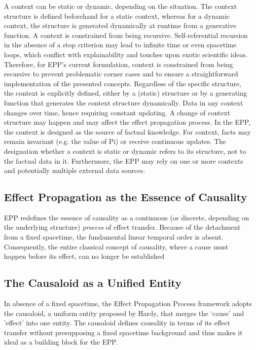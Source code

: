 A context can be static or dynamic, depending on the situation. The context structure is defined beforehand for a static context, whereas for a dynamic context, the structure is generated dynamically at runtime from a generative function. A context is constrained from being recursive. Self-referential recursion in the absence of a stop criterion may lead to infinite time or even spacetime loops, which conflict with explainability and touches upon exotic scientific ideas. Therefore, for EPP's current formulation, context is constrained from being recursive to prevent problematic corner cases and to ensure a straightforward implementation of the presented concepts. Regardless of the specific structure, the context is explicitly defined, either by a (static) structure or by a generating function that generates the context structure dynamically.
Data in any context changes over time, hence requiring constant updating. A change of context structure may happen and may affect the effect propagation process. 
In the EPP, the context is designed as the source of factual knowledge. For context, facts may remain invariant (e.g. the value of Pi) or receive continuous updates. The designation whether a context is static or dynamic refers to its structure, not to the factual data in it. Furthermore, the EPP may rely on one or more contexts and potentially multiple external data sources.
    
\subsection{Effect Propagation as the Essence of Causality}
\label{ssec:recap_effect_propagation}

EPP redefines the essence of causality  as a continuous (or discrete, depending on the underlying structure) \textit{process} of effect transfer. Because of the detachment from a fixed spacetime, the fundamental linear temporal order is absent. Consequently, the entire classical concept of causality, where a cause must happen before its effect, can no longer be established 
    
\subsection{The Causaloid as a Unified Entity}
\label{ssec:recap_causaloid}

In absence of a fixed spacetime, the Effect Propagation Process framework adopts the causaloid, a uniform entity proposed by Hardy\cite{HardyDynamicCausalStructure}, that merges the ‘cause’ and ’effect’ into one entity. The causaloid defines causality in terms of its effect transfer without presupposing a fixed spacetime background and thus makes it ideal as a building block for the EPP. 

